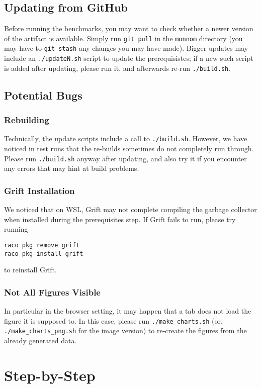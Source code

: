 \documentclass{article}
\begin{document}
\subsection{Updating from GitHub}
Before running the benchmarks, you may want to check whether a newer version of the artifact is available.
Simply run \texttt{git pull} in the \texttt{monnom} directory (you may have to \texttt{git stash} any changes you may have made).
Bigger updates may include an \texttt{./updateN.sh} script to update the prerequisistes; if a new such script is added after updating, please run it, and afterwards re-run \texttt{./build.sh}.

\subsection{Potential Bugs}

\subsubsection{Rebuilding}
Technically, the update scripts include a call to \texttt{./build.sh}.
However, we have noticed in test runs that the re-builds sometimes do not completely run through.
Please run \texttt{./build.sh} anyway after updating, and also try it if you encounter any errors that may hint at build problems.

\subsubsection{Grift Installation}
We noticed that on WSL, Grift may not complete compiling the garbage collector when installed during the prerequisites step.
If Grift fails to run, please try running
\begin{verbatim}
raco pkg remove grift
raco pkg install grift
\end{verbatim}
to reinstall Grift.

\subsubsection{Not All Figures Visible}
In particular in the browser setting, it may happen that a tab does not load the figure it is supposed to.
In this case, please run \texttt{./make\_charts.sh} (or, \texttt{./make\_charts\_png.sh} for the image version) to re-create the figures from the already generated data.

\section{Step-by-Step}
\end{document}
